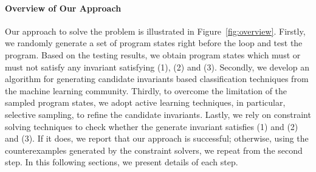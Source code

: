 \paragraph{Overview of Our Approach} 
Our approach to solve the problem is illustrated in Figure~\ref{fig:overview}. 
Firstly, we randomly generate a set of program states right before the loop and test the program. 
Based on the testing results, we obtain program states which must or must not satisfy any invariant satisfying (1), (2) and (3). 
Secondly, we develop an algorithm for generating candidate invariants based classification techniques from the machine learning community. 
Thirdly, to overcome the limitation of the sampled program states, 
we adopt active learning techniques, in particular, selective sampling, to refine the candidate invariants. 
Lastly, we rely on constraint solving techniques to check whether the generate invariant satisfies (1) and (2) and (3). 
If it does, we report that our approach is successful; 
otherwise, using the counterexamples generated by the constraint solvers, we repeat from the second step. 
In this following sections, we present details of each step.
